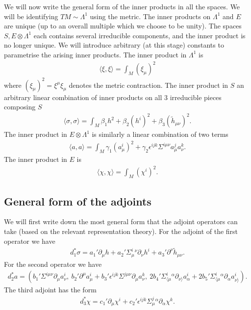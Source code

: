 \documentclass[10pt]{report}
\theoremstyle{definition}
\begin{document}
We will now write the general form of the inner products in all the spaces. We will be identifying $TM\sim \Lambda^1$ using the metric. The inner products on $\Lambda^1$ and $E$ are unique (up to an overall multiple which we choose to be unity). The spaces $S, E\otimes \Lambda^1$ each contains several irreducible components, and the inner product is no longer unique. We will introduce arbitrary (at this stage) constants to parametrise the arising inner products. The inner product in $\Lambda^1$ is
\begin{align}
\langle \xi,\xi\rangle = \int_M (\xi_\mu)^2
\end{align}
where $(\xi_\mu)^2=\xi^\mu \xi_\mu$ denotes the metric contraction. The inner product in $S$ an arbitrary linear combination of inner products on all 3 irreducible pieces composing $S$
\begin{align}
\langle \sigma,\sigma \rangle = \int_M \beta_1 h^2 + \beta_2 (h^i)^2 + \beta_3 (\tilde{h}_{\mu\nu})^2.
\end{align}
The inner product in $E\otimes \Lambda^1$ is similarly a linear combination of two terms
\begin{align}
\langle a,a\rangle = \int_M \gamma_1 (a_\mu^i)^2 + \gamma_2 \epsilon^{ijk} \Sigma^{i\mu\nu} a^j_\mu a^k_\nu.
\end{align}
The inner product in $E$ is
\begin{align}
\langle \chi,\chi\rangle = \int_M (\chi^i)^2.
\end{align}

\subsection{General form of the adjoints}

We will first write down the most general form that the adjoint operators can take (based on the relevant representation theory). For the adjoint of the first operator we have
\begin{align}\label{d1-adj-gen}
d_1^* \sigma = a_1' \partial_\mu h + a_2' \Sigma^i_\mu{}^\nu \partial_\nu h^i + a_3' \partial^\nu \tilde{h}_{\mu\nu}.
\end{align}
For the second operator we have
\begin{align}\label{d2-adj-gen}
d_2^* a = (b_1' \Sigma^{i\mu\nu} \partial_\mu a_\nu^i,\ b_2' \partial^\mu a_\mu^i + b_3' \epsilon^{ijk} \Sigma^{j\mu\nu} \partial_\mu a_\nu^k,\ 
2b_4' \Sigma^i_{\langle \mu}{}^\alpha \partial_{\nu\rangle }a_\alpha^i +  2b_5' \Sigma^i_{\langle \mu}{}^\alpha \partial_\alpha a_{\nu\rangle }^i).
\end{align}
The third adjoint has the form
\begin{align}\label{d3-adj-gen}
d_3^* \chi = c_1' \partial_\mu \chi^i + c_2' \epsilon^{ijk} \Sigma^j_\mu{}^\alpha \partial_\alpha \chi^k.
\end{align}
\end{document}
